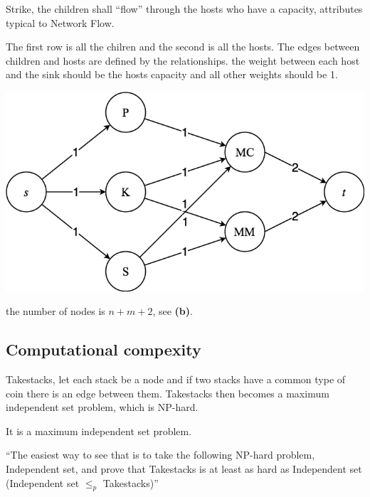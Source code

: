 \documentclass[a4paper]{article}
\newenvironment{task}[1]
{
	\begin{description}[align=right]
		\item [#1]
}{		%
	\end{description}
}
\newcommand{\taskref}[1]{\textbf{#1}}
\DeclareMathOperator{\*}{\cdot}
\begin{document}
\begin{task}{6. (a)}
	 Strike, the children shall ``flow'' through the hosts who have a capacity, attributes typical to Network Flow.
\end{task}

\begin{task}{(b)}
	\qquad The first row is all the chilren and the second is all the hosts. The edges between children and hosts are defined by the relationships. the weight between each host and the sink should be the hosts capacity and all other weights should be 1.
	
	\includegraphics[scale=0.3]{130529-6b.png}
\end{task}

\begin{task}{(c)}
	 the number of nodes is $n+m+2$, see \taskref{(b)}.
\end{task}

\subsection*{Computational compexity}

\begin{task}{7. (a)}
	 Takestacks, let each stack be a node and if two stacks have a common type of coin there is an edge between them. Takestacks then becomes a maximum independent set problem, which is NP-hard.
\end{task}

\begin{task}{(b)}
	 It is a maximum independent set problem.
\end{task}

\begin{task}{(c)}
	 ``The easiest way to see that is to take the following NP-hard problem, Independent set, and prove that Takestacks is at least as hard as Independent set (Independent set $\leq_p$ Takestacks)''
\end{task}
\end{document}
